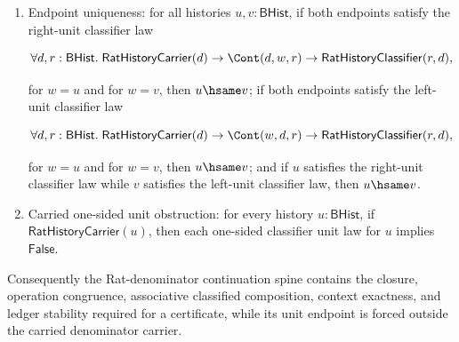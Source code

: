 \begin{theorem}
\begin{enumerate}
$$
\forall d,r:\mathsf{BHist}.\;
\mathsf{RatHistoryCarrier}(d)\to
\Cont(d,u,r)\to
\mathsf{RatHistoryClassifier}(r,d)
$$

or

$$
\forall d,r:\mathsf{BHist}.\;
\mathsf{RatHistoryCarrier}(d)\to
\Cont(u,d,r)\to
\mathsf{RatHistoryClassifier}(r,d),
$$

then $u\hsame\emp$.
\item Endpoint uniqueness: for all histories $u,v:\mathsf{BHist}$, if both
endpoints satisfy the right-unit classifier law

$$
\forall d,r:\mathsf{BHist}.\;
\mathsf{RatHistoryCarrier}(d)\to
\Cont(d,w,r)\to
\mathsf{RatHistoryClassifier}(r,d),
$$

for $w=u$ and for $w=v$, then $u\hsame v$; if both endpoints satisfy the
left-unit classifier law

$$
\forall d,r:\mathsf{BHist}.\;
\mathsf{RatHistoryCarrier}(d)\to
\Cont(w,d,r)\to
\mathsf{RatHistoryClassifier}(r,d),
$$

for $w=u$ and for $w=v$, then $u\hsame v$; and if $u$ satisfies the right-unit
classifier law while $v$ satisfies the left-unit classifier law, then
$u\hsame v$.
\item Carried one-sided unit obstruction: for every history $u:\mathsf{BHist}$,
if $\mathsf{RatHistoryCarrier}(u)$, then each one-sided classifier unit law for
$u$ implies $\mathsf{False}$.
\end{enumerate}
Consequently the Rat-denominator continuation spine contains the closure,
operation congruence, associative classified composition, context exactness, and
ledger stability required for a certificate, while its unit endpoint is forced
outside the carried denominator carrier.
\end{theorem}
